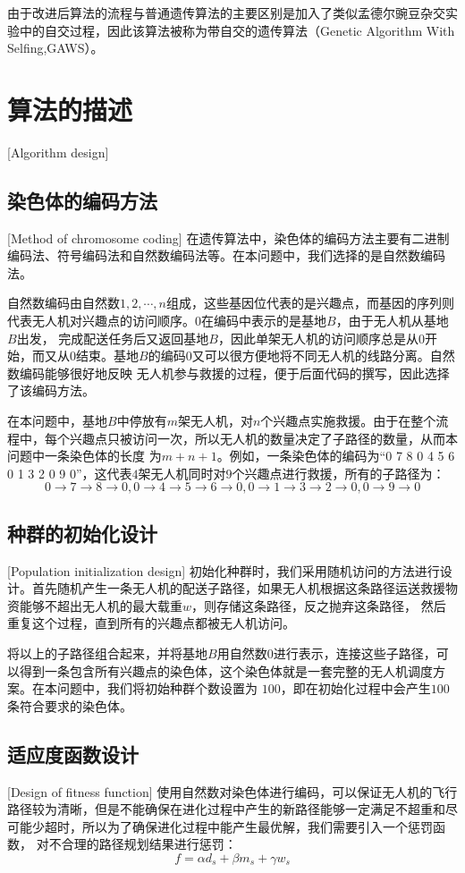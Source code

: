 由于改进后算法的流程与普通遗传算法的主要区别是加入了类似孟德尔豌豆杂交实验中的自交过程，因此该算法被称为带自交的遗传算法（Genetic Algorithm With Selfing,GAWS）。
\section{算法的描述}[Algorithm design]

\subsection{染色体的编码方法}[Method of chromosome coding]
在遗传算法中，染色体的编码方法主要有二进制编码法、符号编码法和自然数编码法等。在本问题中，我们选择的是自然数编码法。


自然数编码由自然数$1,2,\cdots,n$组成，这些基因位代表的是兴趣点，而基因的序列则代表无人机对兴趣点的访问顺序。$0$在编码中表示的是基地$B$，由于无人机从基地$B$出发，
完成配送任务后又返回基地$B$，因此单架无人机的访问顺序总是从$0$开始，而又从$0$结束。基地$B$的编码$0$又可以很方便地将不同无人机的线路分离。自然数编码能够很好地反映
无人机参与救援的过程，便于后面代码的撰写，因此选择了该编码方法。


在本问题中，基地$B$中停放有$m$架无人机，对$n$个兴趣点实施救援。由于在整个流程中，每个兴趣点只被访问一次，所以无人机的数量决定了子路径的数量，从而本问题中一条染色体的长度
为$m+n+1$。例如，一条染色体的编码为``0 7 8 0 4 5 6 0 1 3 2 0 9 0''，这代表$4$架无人机同时对$9$个兴趣点进行救援，所有的子路径为：
$$0\rightarrow7\rightarrow8\rightarrow0,0\rightarrow4\rightarrow5\rightarrow6\rightarrow0,0\rightarrow1\rightarrow3\rightarrow2\rightarrow0,0\rightarrow9\rightarrow0$$

\subsection{种群的初始化设计}[Population initialization design]
初始化种群时，我们采用随机访问的方法进行设计。首先随机产生一条无人机的配送子路径，如果无人机根据这条路径运送救援物资能够不超出无人机的最大载重$w$，则存储这条路径，反之抛弃这条路径，
然后重复这个过程，直到所有的兴趣点都被无人机访问。


将以上的子路径组合起来，并将基地$B$用自然数$0$进行表示，连接这些子路径，可以得到一条包含所有兴趣点的染色体，这个染色体就是一套完整的无人机调度方案。在本问题中，我们将初始种群个数设置为
$100$，即在初始化过程中会产生$100$条符合要求的染色体。

\subsection{适应度函数设计}[Design of fitness function]
使用自然数对染色体进行编码，可以保证无人机的飞行路径较为清晰，但是不能确保在进化过程中产生的新路径能够一定满足不超重和尽可能少超时，所以为了确保进化过程中能产生最优解，我们需要引入一个惩罚函数，
对不合理的路径规划结果进行惩罚：
\begin{equation}
	f= \alpha d_s + \beta m_s + \gamma w_s
\end{equation}

